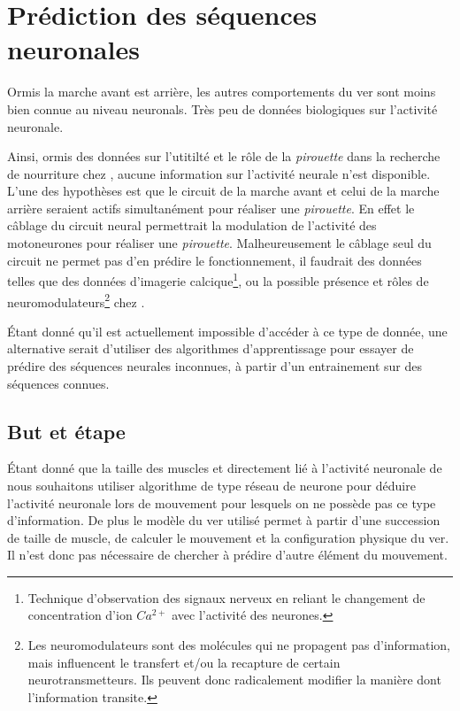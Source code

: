 \chapter{Prédiction des séquences neuronales} %
\label{cha:Prédire des séquences neuronales}

Ormis la marche avant est arrière, les autres comportements du ver sont moins
bien connue au niveau neuronals. Très peu de données biologiques sur l'activité
neuronale.

Ainsi, ormis des données sur l'utitilté et le rôle de la \textit{pirouette}
dans la recherche de nourriture chez \celeg{}\cite{Gray2005}, aucune
information sur l'activité neurale n'est disponible. L'une des hypothèses
est que le circuit de la marche avant et celui de la marche arrière seraient
actifs simultanément pour réaliser une \textit{pirouette}. En effet le câblage
du circuit neural permettrait la modulation de l'activité des motoneurones pour
réaliser une \textit{pirouette}. Malheureusement le câblage seul du circuit ne
permet pas d'en prédire le fonctionnement, il faudrait des données telles que
des données d'imagerie calcique\footnote{Technique d'observation des signaux
nerveux en reliant le changement de concentration d'ion $Ca^{2+}$ avec
l'activité des neurones.}, ou la possible présence et rôles de
neuromodulateurs\footnote{Les neuromodulateurs sont des molécules qui ne
propagent pas d'information, mais influencent le transfert et/ou la recapture
de certain neurotransmetteurs. Ils peuvent donc radicalement modifier la
manière dont l'information transite.} chez \celeg{}.

Étant donné qu'il est actuellement impossible d'accéder à ce type de donnée, une
alternative serait d'utiliser des algorithmes d'apprentissage pour essayer de
prédire des séquences neurales inconnues, à partir d'un entrainement sur des
séquences connues.

\section{But et étape} %
\label{sec:But et étape}

Étant donné que la taille des muscles et directement lié à l'activité neuronale
de \celeg{} nous souhaitons utiliser algorithme de type réseau de neurone pour
déduire l'activité neuronale lors de mouvement pour lesquels on ne possède pas
ce type d'information. De plus le modèle du ver utilisé permet à partir d'une
succession de taille de muscle, de calculer le mouvement et la configuration
physique du ver. Il n'est donc pas nécessaire de chercher à prédire d'autre
élément du mouvement.

